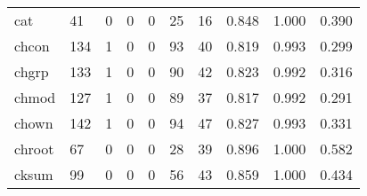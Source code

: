 \begin{longtable}{lp{1.3cm}p{1.3cm}p{1.3cm}p{1.3cm}p{1.3cm}p{1.3cm}p{1.3cm}p{1.3cm}p{1.3cm}}
cat       &                     41 &                                             0 &                                            0 &                                           0 &                                           25 &                                         16 &                                0.848 &                                  1.000 &                                0.390 \\
chcon     &                    134 &                                             1 &                                            0 &                                           0 &                                           93 &                                         40 &                                0.819 &                                  0.993 &                                0.299 \\
chgrp     &                    133 &                                             1 &                                            0 &                                           0 &                                           90 &                                         42 &                                0.823 &                                  0.992 &                                0.316 \\
chmod     &                    127 &                                             1 &                                            0 &                                           0 &                                           89 &                                         37 &                                0.817 &                                  0.992 &                                0.291 \\
chown     &                    142 &                                             1 &                                            0 &                                           0 &                                           94 &                                         47 &                                0.827 &                                  0.993 &                                0.331 \\
chroot    &                     67 &                                             0 &                                            0 &                                           0 &                                           28 &                                         39 &                                0.896 &                                  1.000 &                                0.582 \\
cksum     &                     99 &                                             0 &                                            0 &                                           0 &                                           56 &                                         43 &                                0.859 &                                  1.000 &                                0.434 \\

\end{longtable}
